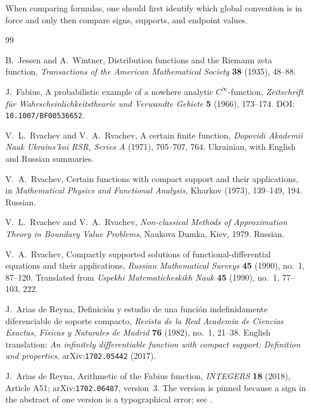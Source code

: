\documentclass[11pt,oneside]{article}
\theoremstyle{definition}
\theoremstyle{remark}
\begin{document}
When comparing formulas, one should first identify which global convention is in force and
only then compare signs, supports, and endpoint values.

\begin{thebibliography}{99}

B.~Jessen and A.~Wintner,
\newblock Distribution functions and the Riemann zeta function,
\newblock \emph{Transactions of the American Mathematical Society}
  \textbf{38} (1935), 48--88.

J.~Fabius,
\newblock A probabilistic example of a nowhere analytic $C^\infty$-function,
\newblock \emph{Zeitschrift für Wahrscheinlichkeitstheorie und Verwandte Gebiete}
  \textbf{5} (1966), 173--174.
\newblock DOI: \nolinkurl{10.1007/BF00536652}.

V.~L.~Rvachev and V.~A.~Rvachev,
\newblock A certain finite function,
\newblock \emph{Dopovidi Akademii Nauk Ukrains'koi RSR, Series A}
  (1971), 705--707, 764.  Ukrainian, with English and Russian summaries.

V.~A.~Rvachev,
\newblock Certain functions with compact support and their applications,
\newblock in \emph{Mathematical Physics and Functional Analysis}, Kharkov
  (1973), 139--149, 194.  Russian.

V.~L.~Rvachev and V.~A.~Rvachev,
\newblock \emph{Non-classical Methods of Approximation Theory in Boundary Value
  Problems},
\newblock Naukova Dumka, Kiev, 1979.  Russian.

V.~A.~Rvachev,
\newblock Compactly supported solutions of functional-differential equations
  and their applications,
\newblock \emph{Russian Mathematical Surveys} \textbf{45} (1990), no.~1,
  87--120.
\newblock Translated from \emph{Uspekhi Matematicheskikh Nauk} \textbf{45}
  (1990), no.~1, 77--103, 222.

J.~Arias de Reyna,
\newblock Definición y estudio de una función indefinidamente diferenciable de
  soporte compacto,
\newblock \emph{Revista de la Real Academia de Ciencias Exactas, Físicas y
  Naturales de Madrid} \textbf{76} (1982), no.~1, 21--38.
\newblock English translation:
  \emph{An infinitely differentiable function with compact support: Definition and
  properties}, arXiv:\nolinkurl{1702.05442} (2017).

J.~Arias de Reyna,
\newblock Arithmetic of the Fabius function,
\newblock \emph{INTEGERS} \textbf{18} (2018), Article A51;
  arXiv:\nolinkurl{1702.06487}, version~3.
\newblock The version is pinned because a sign in the abstract of one version
  is a typographical error; see .


\end{thebibliography}
\end{document}
